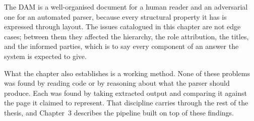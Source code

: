 The DAM is a well-organised document for a human reader and an adversarial one for an automated parser, because every structural property it has is expressed through layout. The issues catalogued in this chapter are not edge cases; between them they affected the hierarchy, the role attribution, the titles, and the informed parties, which is to say every component of an answer the system is expected to give.

What the chapter also establishes is a working method. None of these problems was found by reading code or by reasoning about what the parser should produce. Each was found by taking extracted output and comparing it against the page it claimed to represent. That discipline carries through the rest of the thesis, and Chapter~3 describes the pipeline built on top of these findings.
